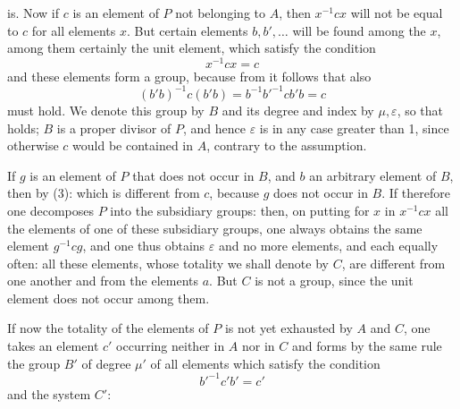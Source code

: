 is. Now if $c$ is an element of $P$ not belonging to $A$, then $x^{-1}cx$ will not be equal to $c$ for all elements $x$. But certain elements $b, b', \ldots$ will be found among the $x$, among them certainly the unit element, which satisfy the condition
\[ x^{-1}cx = c \]
and these elements form a group, because from
it follows that also
\[ (b'b)^{-1}c(b'b) = b^{-1}b'^{-1}cb'b = c \]
must hold. We denote this group by $B$ and its degree and index by $\mu, \varepsilon$, so that
holds; $B$ is a proper divisor of $P$, and hence $\varepsilon$ is in any case greater than 1, since otherwise $c$ would be contained in $A$, contrary to the assumption.

If $g$ is an element of $P$ that does not occur in $B$, and $b$ an arbitrary element of $B$, then by (3):
which is different from $c$, because $g$ does not occur in $B$. If therefore one decomposes $P$ into the subsidiary groups:
then, on putting for $x$ in $x^{-1}cx$ all the elements of one of these subsidiary groups, one always obtains the same element $g^{-1}cg$, and one thus obtains $\varepsilon$ and no more elements, and each equally often:
all these elements, whose totality we shall denote by $C$, are different from one another and from the elements $a$. But $C$ is not a group, since the unit element does not occur among them.

If now the totality of the elements of $P$ is not yet exhausted by $A$ and $C$, one takes an element $c'$ occurring neither in $A$ nor in $C$ and forms by the same rule the group $B'$ of degree $\mu'$ of all elements which satisfy the condition
\[ b'^{-1}c'b' = c' \]
and the system $C'$:

